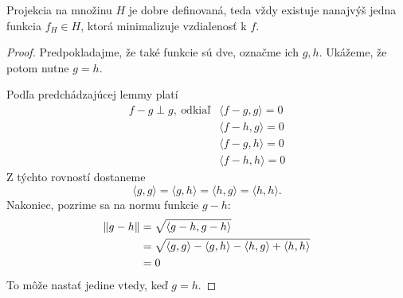 \begin{lemma}
  Projekcia na množinu $H$ je dobre definovaná, teda vždy existuje
  nanajvýš jedna funkcia $f_H \in H$, ktorá minimalizuje vzdialenosť
  k $f$.
\end{lemma}
\begin{proof}
  Predpokladajme, že také funkcie sú dve, označme ich $g, h$. Ukážeme,
  že potom nutne $g = h$.
  
  Podľa predchádzajúcej lemmy platí
  \begin{align}
    f - g \perp g,\ \text{odkiaľ} &\langle f - g, g \rangle = 0 \\
                                  &\langle f - h, g \rangle = 0 \\
                                  &\langle f - g, h \rangle = 0 \\
                                  &\langle f - h, h \rangle = 0
  \end{align}
  Z týchto rovností dostaneme
  $$\langle g, g \rangle = \langle g, h \rangle = \langle h, g \rangle = \langle h, h \rangle.$$
  Nakoniec, pozrime sa na normu funkcie $g - h$:
  \begin{align}
    \left\lVert g - h\right\rVert
      &= \sqrt{\langle g - h, g - h \rangle} \\
      &= \sqrt{\langle g, g \rangle - \langle g, h \rangle - \langle h, g \rangle + \langle h, h \rangle} \\
      &= 0
  \end{align}
  To môže nastať jedine vtedy, keď $g = h$.
\end{proof}


